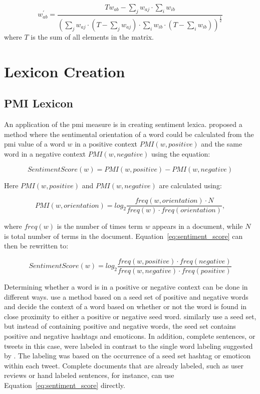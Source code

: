 \begin{equation}
\label{eq:pearson_normalization}
    w_{ab}^{'}=\frac{Tw_{ab}-\sum_{j}w_{aj}\cdot\sum_{i}w_{ib}}{(\sum_{j}w_{aj}\cdot(T-\sum_{j}w_{aj})\cdot\sum_{i}w_{ib}\cdot(T-\sum_{i}w_{ib}))^\frac{1}{2}}
\end{equation}
where $T$ is the sum of all elements in the matrix.


\section{Lexicon Creation}
\subsection{PMI Lexicon}
\label{sec:pmi_lexicon}
An application of the \ac{pmi} measure is in creating sentiment lexica. \cite{turneylittman2002} proposed a method where the sentimental orientation of a word could be calculated from the \ac{pmi} value of a word $w$ in a positive context $PMI(w, positive)$ and the same word in a negative context $PMI(w, negative)$ using the equation:

\begin{equation}
\label{eq:sentiment_score}
    Sentiment Score(w) = PMI(w, positive) - PMI(w, negative)
\end{equation}

Here $PMI(w, positive)$ and $PMI(w, negative)$ are calculated using:

\begin{equation}
\label{eq:pmi_orientation}
    PMI(w, orientation) = log_2 \frac{freq(w, orientation) \cdot N}{freq(w) \cdot freq(orientation)},
\end{equation}

\noindent where $freq(w)$ is the number of times term $w$ appears in a document, while $N$ is total number of terms in the document. Equation~\ref{eq:sentiment_score} can then be rewritten to:

\begin{equation}
\label{eq:sentiment_score_final}
    Sentiment Score(w) = log_2 \frac{freq(w, positive) \cdot freq(negative)}{freq(w, negative) \cdot freq(positive)}
\end{equation}

Determining whether a word is in a positive or negative context can be done in different ways. \citeauthor{turneylittman2002} use a method based on a seed set of positive and negative words and decide the context of a word based on whether or not the word is found in close proximity to either a positive or negative seed word. \cite{MohammadKZ2013} similarly use a seed set, but instead of containing positive and negative words, the seed set contains positive and negative hashtags and emoticons. In addition, complete sentences, or tweets in this case, were labeled in contrast to the single word labeling suggested by \citeauthor{turneylittman2002}. The labeling was based on the occurrence of a seed set hashtag or emoticon within each tweet. Complete documents that are already labeled, such as user reviews or hand labeled sentences, for instance, can use Equation~\ref{eq:sentiment_score} directly.


